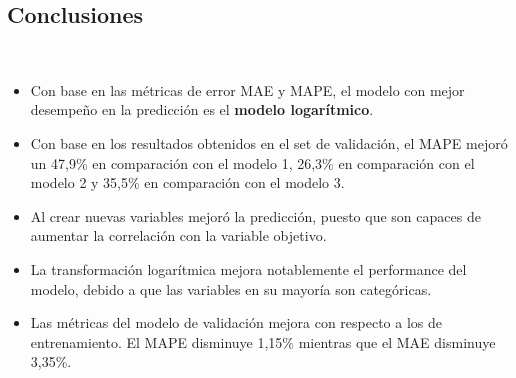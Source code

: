 \documentclass[
	11pt, %
	spanish, %
]{fphw}
\begin{document}
\subsection*{Conclusiones} \hfill \\

\begin{itemize}
\item Con base en las métricas de error MAE y MAPE, el modelo con mejor desempeño en la predicción es el \textbf{modelo logarítmico}.
\item Con base en los resultados obtenidos en el set de validación, el MAPE mejoró un 47,9\% en comparación con el modelo 1, 26,3\% en comparación con el modelo 2 y 35,5\% en comparación con el modelo 3.
\item Al crear nuevas variables mejoró la predicción, puesto que son capaces de aumentar la correlación con la variable objetivo.
\item La transformación logarítmica mejora notablemente el performance del modelo, debido a que las variables en su mayoría son categóricas.
\item Las métricas del modelo de validación mejora con respecto a los de entrenamiento. El MAPE disminuye 1,15\% mientras que el MAE disminuye 3,35\%.
\end{itemize}




\end{document}
